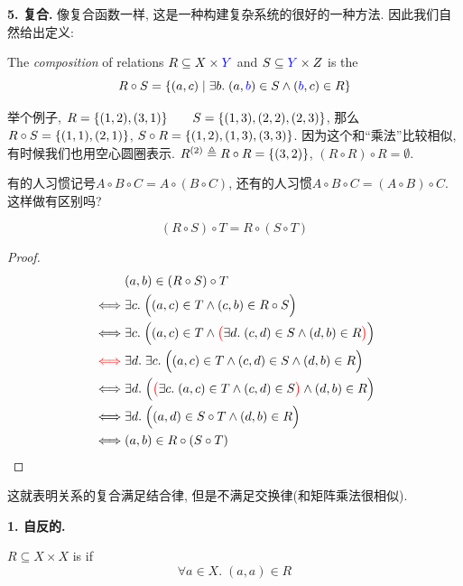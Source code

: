 \textbf{5. 复合. } 像复合函数一样, 这是一种构建复杂系统的很好的一种方法. 因此我们自然给出定义: 
\begin{definition}
  The {\it composition} of relations $R \subseteq X \times \textcolor{blue}{Y}$
  and $S \subseteq \textcolor{blue}{Y} \times Z$ is the 
  \[
    R \circ S = \{(a, c) \mid \exists b.\; (a, \textcolor{blue}{b}) \in S \land (\textcolor{blue}{b}, c) \in R\}
  \]
\end{definition}

举个例子, $R = \{(1, 2), (3, 1)\} \qquad S = \{(1, 3), (2, 2), (2, 3)\}$, 那么$R \circ S = \{(1, 1), (2, 1)\}$, $S \circ R = \{(1, 2), (1, 3), (3, 3)\}$. 因为这个和``乘法''比较相似, 有时候我们也用空心圆圈表示. $R^{(2)} \triangleq R \circ R = \{(3, 2)\}$, $ (R \circ R) \circ R =  \emptyset$. 

\begin{bonus}
  有的人习惯记号$A\circ B\circ C=A\circ (B\circ C)$, 还有的人习惯$A\circ B\circ C=(A\circ B)\circ C$. 这样做有区别吗?  
\end{bonus}
\begin{theorem}
  \[
    (R \circ S) \circ T = R \circ (S \circ T)
  \]
\end{theorem}
\begin{proof}
  \setcounter{equation}{0}
  \begin{align*}
    &(a, b) \in (R \circ S) \circ T \\
    \iff& \exists c.\; \Big((a, c) \in T \land (c, b) \in R \circ S\Big) \\
    \iff& \exists c.\; \Big((a, c) \in T \land \textcolor{red}{\big(}\exists d.\; (c, d) \in S \land (d, b) \in R\textcolor{red}{\big)}\Big) \\
    \textcolor{red}{\iff}& \exists d.\; \exists c.\; \Big((a, c) \in T \land (c, d) \in S \land (d, b) \in R\Big) \\
    \iff& \exists d.\; \Big(\textcolor{red}{\big(}\exists c.\; (a, c) \in T \land (c, d) \in S\textcolor{red}{\big)} \land (d, b) \in R\Big) \\
    \iff& \exists d.\; \Big((a, d) \in S \circ T \land (d, b) \in R\Big) \\
    \iff& (a, b) \in R \circ (S \circ T)
  \end{align*} 
\end{proof}

这就表明关系的复合满足结合律, 但是不满足交换律(和矩阵乘法很相似). 

\textbf{1. 自反的. }

\begin{definition}
  $R \subseteq X \times X$ is  if
  \[
    \forall a \in X.\; (a, a) \in R
  \]
  \begin{center}
\end{center}\end{definition}


